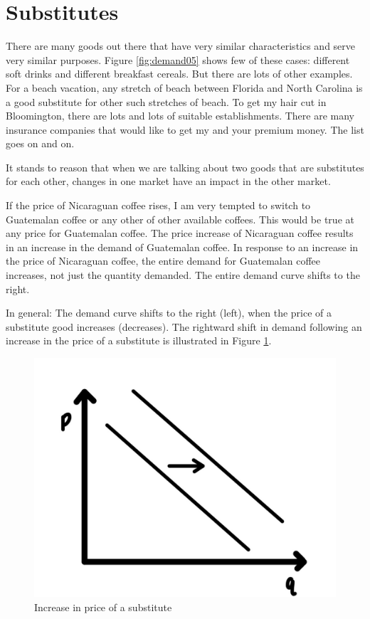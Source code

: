 \documentclass[
]{book}
\begin{document}
\hypertarget{substitutes}{%
\section{Substitutes}\label{substitutes}}

There are many goods out there that have very similar characteristics and serve very similar purposes. Figure \ref{fig:demand05} shows few of these cases: different soft drinks and different breakfast cereals. But there are lots of other examples. For a beach vacation, any stretch of beach between Florida and North Carolina is a good substitute for other such stretches of beach. To get my hair cut in Bloomington, there are lots and lots of suitable establishments. There are many insurance companies that would like to get my and your premium money. The list goes on and on.

It stands to reason that when we are talking about two goods that are substitutes for each other, changes in one market have an impact in the other market.

If the price of Nicaraguan coffee rises, I am very tempted to switch to Guatemalan coffee or any other of other available coffees. This would be true at any price for Guatemalan coffee. The price increase of Nicaraguan coffee results in an increase in the demand of Guatemalan coffee. In response to an increase in the price of Nicaraguan coffee, the entire demand for Guatemalan coffee increases, not just the quantity demanded. The entire demand curve shifts to the right.

In general: The demand curve shifts to the right (left), when the price of a substitute good increases (decreases). The rightward shift in demand following an increase in the price of a substitute is illustrated in Figure \ref{fig:demand07}.

\begin{figure}

{\centering \includegraphics[width=0.75\linewidth]{img/demand/fig7} 

}

\caption{Increase in price of a substitute}\label{fig:demand07}
\end{figure}
\end{document}
